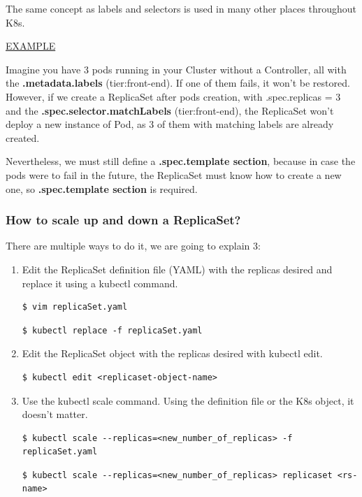 \documentclass{article}
\newenvironment{codetemplate}[1][]{%
  \mybasecolorbox[#1]
  \itshape
}{%
  \endmybasecolorbox
}
\begin{document}
The same concept as labels and selectors is used in many other places throughout K8s.

\underline{EXAMPLE}

Imagine you have 3 pods running in your Cluster without a Controller, all with the \textbf{.metadata.labels} (tier:front-end). If one of them fails, it won't be restored. However, if we create a ReplicaSet after pods creation, with .spec.replicas = 3 and the \textbf{.spec.selector.matchLabels}  (tier:front-end), the ReplicaSet won't deploy a new instance of Pod, as 3 of them with matching labels are already created.

Nevertheless, we must still define a \textbf{.spec.template section}, because in case the pods were to fail in the future, the ReplicaSet must know how to create a new one, so \textbf{.spec.template section} is required.

\subsubsection{How to scale up and down a ReplicaSet?}

There are multiple ways to do it, we are going to explain 3:

\begin{enumerate}
    \item Edit the ReplicaSet definition file (YAML) with the replicas desired and replace it using a kubectl command.
\begin{codetemplate}{}
\begin{verbatim}
$ vim replicaSet.yaml
\end{verbatim}
\end{codetemplate}
\begin{codetemplate}{}
\begin{verbatim}
$ kubectl replace -f replicaSet.yaml
\end{verbatim}
\end{codetemplate}

    \item Edit the ReplicaSet object with the replicas desired with kubectl edit.
\begin{codetemplate}{}
\begin{verbatim}
$ kubectl edit <replicaset-object-name>
\end{verbatim}
\end{codetemplate}

    \item Use the kubectl scale command. Using the definition file or the K8s object, it doesn't matter.
\begin{codetemplate}{}
\begin{verbatim}
$ kubectl scale --replicas=<new_number_of_replicas> -f replicaSet.yaml
\end{verbatim}
\end{codetemplate}

\begin{codetemplate}{}
\begin{verbatim}
$ kubectl scale --replicas=<new_number_of_replicas> replicaset <rs-name>
\end{verbatim}
\end{codetemplate}
\end{enumerate}
\end{document}
